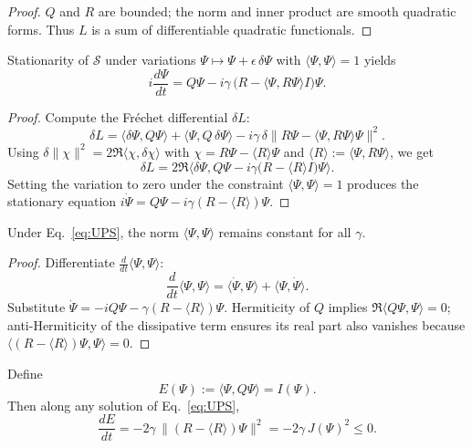 \begin{proof}
$Q$ and $R$ are bounded; the norm and inner product are smooth quadratic forms.
Thus $L$ is a sum of differentiable quadratic functionals.
\end{proof}

\begin{theorem}
Stationarity of $\mathcal{S}$ under variations $\Psi\mapsto \Psi+\epsilon\,\delta\Psi$ with $\langle\Psi,\Psi\rangle=1$ yields
\begin{equation}\label{eq:UPS}
i\frac{d\Psi}{dt}
=
Q\Psi
 - i\gamma\,\big(R - \langle\Psi,R\Psi\rangle I\big)\Psi.
\end{equation}
\end{theorem}

\begin{proof}
Compute the Fréchet differential $\delta L$:
\[
\delta L
=
\langle\delta\Psi,Q\Psi\rangle
+\langle\Psi,Q\,\delta\Psi\rangle
 - i\gamma\,\delta\|R\Psi - \langle\Psi,R\Psi\rangle\Psi\|^2.
\]
Using $\delta\|\chi\|^2=2\Re\langle\chi,\delta\chi\rangle$ with $\chi=R\Psi-\langle R\rangle\Psi$ and $\langle R\rangle:=\langle\Psi,R\Psi\rangle$,
we get
\[
\delta L
= 2\Re\Big\langle \delta\Psi, Q\Psi
 - i\gamma\big(R - \langle R\rangle I\big)\Psi
\Big\rangle.
\]
Setting the variation to zero under the constraint $\langle\Psi,\Psi\rangle=1$ produces the stationary equation
$i\dot\Psi = Q\Psi - i\gamma(R-\langle R\rangle)\Psi$.
\end{proof}

\begin{lemma}
Under Eq.~\eqref{eq:UPS}, the norm $\langle\Psi,\Psi\rangle$ remains constant for all $\gamma$.
\end{lemma}

\begin{proof}
Differentiate $\frac{d}{dt}\langle\Psi,\Psi\rangle$:
\[
\frac{d}{dt}\langle\Psi,\Psi\rangle
=
\langle\dot\Psi,\Psi\rangle + \langle\Psi,\dot\Psi\rangle.
\]
Substitute $\dot\Psi=-iQ\Psi-\gamma(R-\langle R\rangle)\Psi$.
Hermiticity of $Q$ implies $\Re\langle Q\Psi,\Psi\rangle=0$; anti-Hermiticity of the dissipative term ensures its real part also vanishes because $\langle(R-\langle R\rangle)\Psi,\Psi\rangle=0$.
\end{proof}

\begin{theorem}
Define
\[
E(\Psi):=\langle\Psi,Q\Psi\rangle = I(\Psi).
\]
Then along any solution of Eq.~\eqref{eq:UPS},
\[
\frac{dE}{dt} = -2\gamma\,\| (R-\langle R\rangle)\Psi \|^2 = -2\gamma\,J(\Psi)^2 \le 0.
\]
\end{theorem}

